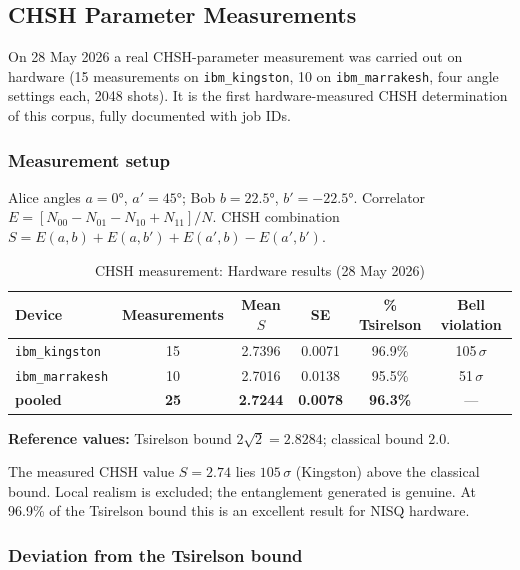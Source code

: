 \subsection{CHSH Parameter Measurements}

On 28 May 2026 a real CHSH-parameter measurement was carried out on hardware (15 measurements on \texttt{ibm\_kingston}, 10 on \texttt{ibm\_marrakesh}, four angle settings each, 2048 shots). It is the first hardware-measured CHSH determination of this corpus, fully documented with job IDs.

\subsubsection{Measurement setup}

Alice angles $a=0°$, $a'=45°$; Bob $b=22.5°$, $b'=-22.5°$. Correlator $E = [N_{00}-N_{01}-N_{10}+N_{11}]/N$. CHSH combination $S = E(a,b)+E(a,b')+E(a',b)-E(a',b')$.

\begin{table}[h]
	\centering
	\caption{CHSH measurement: Hardware results (28 May 2026)}
	\label{tab:chsh_real}
	\begin{tabular}{@{}lccccc@{}}
		\toprule
		Device & Measurements & Mean $S$ & SE & \% Tsirelson & Bell violation \\
		\midrule
		\texttt{ibm\_kingston} & 15 & 2.7396 & 0.0071 & 96.9\% & 105\,$\sigma$ \\
		\texttt{ibm\_marrakesh} & 10 & 2.7016 & 0.0138 & 95.5\% & 51\,$\sigma$ \\
		\textbf{pooled} & \textbf{25} & \textbf{2.7244} & \textbf{0.0078} & \textbf{96.3\%} & --- \\
		\bottomrule
	\end{tabular}
\end{table}

\textbf{Reference values:} Tsirelson bound $2\sqrt{2} = 2.8284$; classical bound $2.0$.

\begin{keyresult}
	The measured CHSH value $S = 2.74$ lies $105\,\sigma$ (Kingston) above the classical bound. Local realism is excluded; the entanglement generated is genuine. At 96.9\% of the Tsirelson bound this is an excellent result for NISQ hardware.
\end{keyresult}

\subsubsection{Deviation from the Tsirelson bound}

